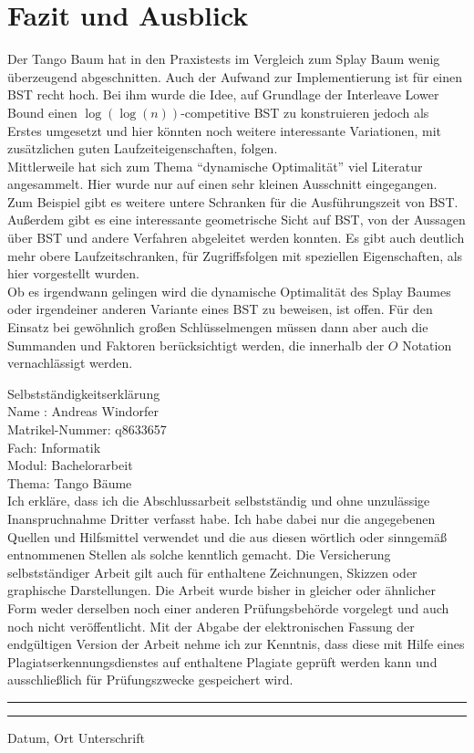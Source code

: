 \documentclass[a4paper,12pt]{article}
\begin{document}
\section{Fazit und Ausblick}
Der Tango Baum hat in den Praxistests im Vergleich zum Splay Baum wenig überzeugend abgeschnitten. Auch der Aufwand zur Implementierung ist für einen BST recht hoch. Bei ihm wurde die Idee, auf Grundlage der Interleave Lower Bound einen $\log\left(\log\left(n\right)\right)$-competitive BST zu konstruieren jedoch als Erstes umgesetzt und hier könnten noch weitere interessante Variationen, mit zusätzlichen guten Laufzeiteigenschaften, folgen. \\
Mittlerweile hat sich zum Thema \enquote{dynamische Optimalität} viel Literatur angesammelt. Hier wurde nur auf einen sehr kleinen Ausschnitt eingegangen. Zum Beispiel gibt es  weitere untere Schranken für die Ausführungszeit von BST. Außerdem gibt es eine interessante geometrische Sicht auf BST, von der Aussagen über BST und andere Verfahren abgeleitet werden konnten. Es gibt auch deutlich mehr obere Laufzeitschranken, für Zugriffsfolgen mit speziellen Eigenschaften, als  hier vorgestellt wurden. \\
Ob es irgendwann gelingen wird die dynamische Optimalität des Splay Baumes oder irgendeiner anderen Variante eines BST zu beweisen, ist offen. Für den Einsatz bei gewöhnlich großen Schlüsselmengen müssen dann aber auch die Summanden und Faktoren berücksichtigt werden, die innerhalb der $O$ Notation vernachlässigt werden.


\newpage
\listoffigures
\newpage
\Large
\noindent Selbstständigkeitserklärung\bigskip\\
\normalsize
\noindent Name : Andreas Windorfer\\
Matrikel-Nummer: q8633657\\
Fach: Informatik\\
Modul: Bachelorarbeit\\
Thema: Tango Bäume \bigskip\\


\noindent Ich erkläre, dass ich die Abschlussarbeit selbstständig und ohne unzulässige Inanspruchnahme Dritter verfasst habe. Ich habe dabei nur die angegebenen Quellen und Hilfsmittel verwendet und die aus diesen wörtlich oder sinngemäß entnommenen Stellen als solche kenntlich gemacht. Die Versicherung selbstständiger Arbeit gilt auch für enthaltene Zeichnungen, Skizzen oder graphische Darstellungen. Die Arbeit wurde bisher in gleicher oder ähnlicher Form weder derselben noch einer anderen Prüfungsbehörde vorgelegt und auch noch nicht veröffentlicht. Mit der Abgabe der elektronischen Fassung der endgültigen Version der Arbeit nehme ich zur Kenntnis, dass diese mit Hilfe eines Plagiatserkennungsdienstes auf enthaltene Plagiate geprüft werden kann und ausschließlich für Prüfungszwecke gespeichert wird.\\

\vspace{50pt}
\noindent\rule{5cm}{.4pt}\hfill\rule{5cm}{.4pt}\par
\noindent Datum, Ort \hfill Unterschrift
                       



\newpage


\end{document}
